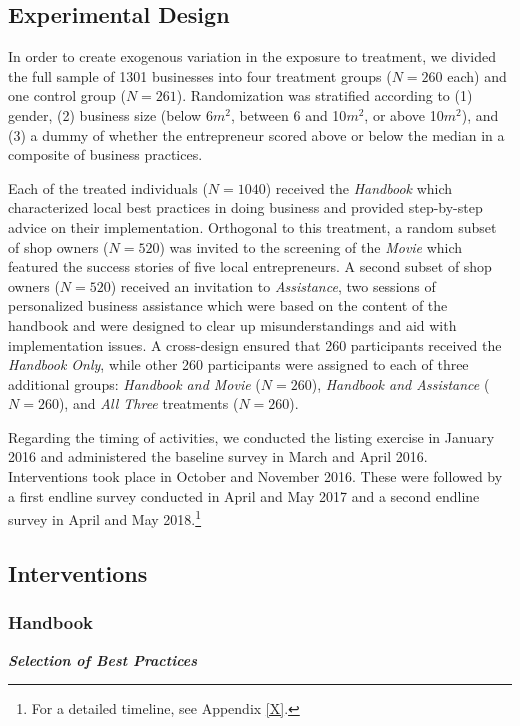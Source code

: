 \documentclass[11.5pt]{article}
\begin{document}
\subsection{Experimental Design}

In order to create exogenous variation in the exposure to treatment, we divided the full sample of 1301 businesses into four treatment groups ($N = 260$ each) and one control group ($N = 261$). Randomization was stratified according to (1) gender, (2) business size (below 6$m^2$, between 6 and 10$m^2$, or above 10$m^2$), and (3) a dummy of whether the entrepreneur scored above or below the median in a composite of business practices.

Each of the treated individuals ($N = 1040$) received the \emph{Handbook} which characterized local best practices in doing business and provided step-by-step advice on their implementation. Orthogonal to this treatment, a random subset of shop owners ($N = 520$) was invited to the screening of the \emph{Movie} which featured the success stories of five local entrepreneurs. A second subset of shop owners ($N = 520$) received an invitation to \emph{Assistance}, two sessions of personalized business assistance which were based on the content of the handbook and were designed to clear up misunderstandings and aid with implementation issues. A cross-design ensured that 260 participants received the \emph{Handbook Only}, while other 260 participants were assigned to each of three additional groups: \emph{Handbook and Movie} ($N = 260$), \emph{Handbook and Assistance} ($N = 260$), and \emph{All Three} treatments ($N = 260$).

Regarding the timing of activities, we conducted the listing exercise in January 2016 and administered the baseline survey in March and April 2016. Interventions took place in October and November 2016. These were followed by a first endline survey conducted in April and May 2017 and a second endline survey in April and May 2018.\footnote{For a detailed timeline, see Appendix \ref{X}.}

\subsection{Interventions}

\subsubsection{Handbook}

\emph{\textbf{Selection of Best Practices}}\
\end{document}
